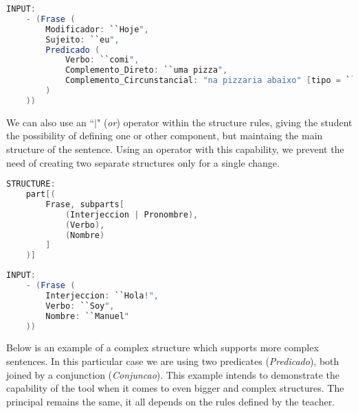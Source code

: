 \begin{center}
\begin{minipage}{15cm}
\begin{lstlisting}[language=java, basicstyle=\small, label={lst:example_input3}, caption=Example of a sentence input]
INPUT:
    - (Frase (
        Modificador: ``Hoje",
        Sujeito: ``eu",
        Predicado (
            Verbo: ``comi",
            Complemento_Direto: ``uma pizza",
            Complemento_Circunstancial: "na pizzaria abaixo" [tipo = ``lugar"]
        )
    ))
\end{lstlisting}
\end{minipage}
\end{center}


We can also use an ``\emph{\(|\)}" (\textit{or}) operator within the structure rules, giving the student the possibility of defining one or other component,
but maintaing the main structure of the sentence. 
Using an operator with this capability, we prevent the need of creating two separate structures only for a single change. 

\begin{center}
\begin{minipage}{10cm}
\begin{lstlisting}[language=java, basicstyle=\small, label={lst:example_structure4}, caption=Example of a sentence structure]
STRUCTURE:
    part[(
        Frase, subparts[
            (Interjeccion | Pronombre),
            (Verbo),
            (Nombre)
        ]
    )]
\end{lstlisting}
\end{minipage}
\end{center}

\begin{center}
\begin{minipage}{10cm}
\begin{lstlisting}[language=java, basicstyle=\small, label={lst:example_input4}, caption=Example of a sentence input]
INPUT:
    - (Frase (
        Interjeccion: ``Hola!",
        Verbo: ``Soy",
        Nombre: ``Manuel"
    ))
\end{lstlisting}
\end{minipage}
\end{center}


Below is an example of a complex structure which supports more complex sentences.
In this particular case we are using two predicates (\textit{Predicado}), both joined by a conjunction (\textit{Conjuncao}).
This example intends to demonstrate the capability of the tool when it comes to even bigger and complex structures.
The principal remains the same, it all depends on the rules defined by the teacher.

